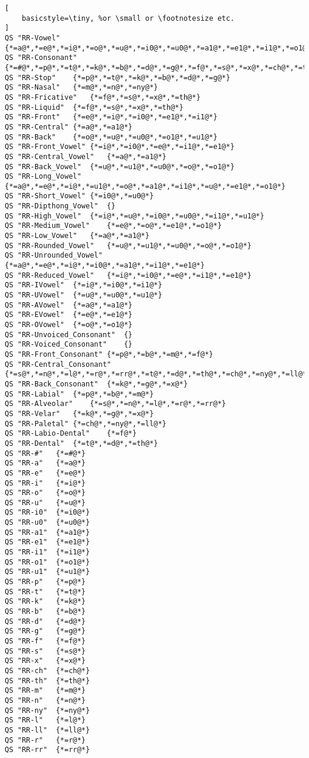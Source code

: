 \begin{lstlisting}[
    basicstyle=\tiny, %or \small or \footnotesize etc.
]
QS "RR-Vowel"	{*=a@*,*=e@*,*=i@*,*=o@*,*=u@*,*=i0@*,*=u0@*,*=a1@*,*=e1@*,*=i1@*,*=o1@*,*=u1@*}
QS "RR-Consonant"	{*=#@*,*=p@*,*=t@*,*=k@*,*=b@*,*=d@*,*=g@*,*=f@*,*=s@*,*=x@*,*=ch@*,*=th@*,*=m@*,*=n@*,*=ny@*,*=l@*,*=ll@*,*=r@*,*=rr@*}
QS "RR-Stop"	{*=p@*,*=t@*,*=k@*,*=b@*,*=d@*,*=g@*}
QS "RR-Nasal"	{*=m@*,*=n@*,*=ny@*}
QS "RR-Fricative"	{*=f@*,*=s@*,*=x@*,*=th@*}
QS "RR-Liquid"	{*=f@*,*=s@*,*=x@*,*=th@*}
QS "RR-Front"	{*=e@*,*=i@*,*=i0@*,*=e1@*,*=i1@*}
QS "RR-Central"	{*=a@*,*=a1@*}
QS "RR-Back"	{*=o@*,*=u@*,*=u0@*,*=o1@*,*=u1@*}
QS "RR-Front_Vowel"	{*=i@*,*=i0@*,*=e@*,*=i1@*,*=e1@*}
QS "RR-Central_Vowel"	{*=a@*,*=a1@*}
QS "RR-Back_Vowel"	{*=u@*,*=u1@*,*=u0@*,*=o@*,*=o1@*}
QS "RR-Long_Vowel"	{*=a@*,*=e@*,*=i@*,*=u1@*,*=o@*,*=a1@*,*=i1@*,*=u@*,*=e1@*,*=o1@*}
QS "RR-Short_Vowel"	{*=i0@*,*=u0@*}
QS "RR-Dipthong_Vowel"	{}
QS "RR-High_Vowel"	{*=i@*,*=u@*,*=i0@*,*=u0@*,*=i1@*,*=u1@*}
QS "RR-Medium_Vowel"	{*=e@*,*=o@*,*=e1@*,*=o1@*}
QS "RR-Low_Vowel"	{*=a@*,*=a1@*}
QS "RR-Rounded_Vowel"	{*=u@*,*=u1@*,*=u0@*,*=o@*,*=o1@*}
QS "RR-Unrounded_Vowel"	{*=a@*,*=e@*,*=i@*,*=i0@*,*=a1@*,*=i1@*,*=e1@*}
QS "RR-Reduced_Vowel"	{*=i@*,*=i0@*,*=e@*,*=i1@*,*=e1@*}
QS "RR-IVowel"	{*=i@*,*=i0@*,*=i1@*}
QS "RR-UVowel"	{*=u@*,*=u0@*,*=u1@*}
QS "RR-AVowel"	{*=a@*,*=a1@*}
QS "RR-EVowel"	{*=e@*,*=e1@*}
QS "RR-OVowel"	{*=o@*,*=o1@*}
QS "RR-Unvoiced_Consonant"	{}
QS "RR-Voiced_Consonant"	{}
QS "RR-Front_Consonant"	{*=p@*,*=b@*,*=m@*,*=f@*}
QS "RR-Central_Consonant"	{*=s@*,*=n@*,*=l@*,*=r@*,*=rr@*,*=t@*,*=d@*,*=th@*,*=ch@*,*=ny@*,*=ll@*}
QS "RR-Back_Consonant"	{*=k@*,*=g@*,*=x@*}
QS "RR-Labial"	{*=p@*,*=b@*,*=m@*}
QS "RR-Alveolar"	{*=s@*,*=n@*,*=l@*,*=r@*,*=rr@*}
QS "RR-Velar"	{*=k@*,*=g@*,*=x@*}
QS "RR-Paletal"	{*=ch@*,*=ny@*,*=ll@*}
QS "RR-Labio-Dental"	{*=f@*}
QS "RR-Dental"	{*=t@*,*=d@*,*=th@*}
QS "RR-#"	{*=#@*}
QS "RR-a"	{*=a@*}
QS "RR-e"	{*=e@*}
QS "RR-i"	{*=i@*}
QS "RR-o"	{*=o@*}
QS "RR-u"	{*=u@*}
QS "RR-i0"	{*=i0@*}
QS "RR-u0"	{*=u0@*}
QS "RR-a1"	{*=a1@*}
QS "RR-e1"	{*=e1@*}
QS "RR-i1"	{*=i1@*}
QS "RR-o1"	{*=o1@*}
QS "RR-u1"	{*=u1@*}
QS "RR-p"	{*=p@*}
QS "RR-t"	{*=t@*}
QS "RR-k"	{*=k@*}
QS "RR-b"	{*=b@*}
QS "RR-d"	{*=d@*}
QS "RR-g"	{*=g@*}
QS "RR-f"	{*=f@*}
QS "RR-s"	{*=s@*}
QS "RR-x"	{*=x@*}
QS "RR-ch"	{*=ch@*}
QS "RR-th"	{*=th@*}
QS "RR-m"	{*=m@*}
QS "RR-n"	{*=n@*}
QS "RR-ny"	{*=ny@*}
QS "RR-l"	{*=l@*}
QS "RR-ll"	{*=ll@*}
QS "RR-r"	{*=r@*}
QS "RR-rr"	{*=rr@*}
\end{lstlisting}